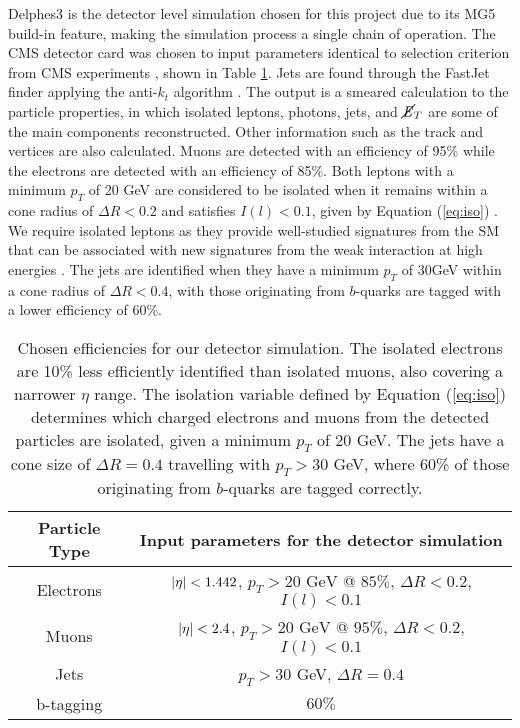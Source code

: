 Delphes3 \cite{de2014delphes} is the detector level simulation chosen for this project due to its MG5 build-in feature, making the simulation process a single chain of operation. The CMS detector card was chosen to input parameters identical to selection criterion from CMS experiments \cite{cms2019search, cms2016searches, cms2017search}, shown in Table \ref{tab:efficiencies}. Jets are found through the FastJet finder \cite{cacciari2012fastjet} applying the anti-$k_t$ algorithm \cite{cacciari2008anti}. The output is a smeared calculation to the particle properties, in which isolated leptons, photons, jets, and $\cancel{\it{E}}_{T}$ are some of the main components reconstructed. Other information such as the track and vertices are also calculated. Muons are detected with an efficiency of 95\% while the electrons are detected with an efficiency of 85\%. Both leptons with a minimum $p_T$ of 20 GeV are considered to be isolated when it remains within a cone radius of $\Delta R <0.2$ and satisfies $I(l)<0.1$, given by Equation (\ref{eq:iso}) \cite{de2014delphes}. We require isolated leptons as they provide well-studied signatures from the SM that can be associated with new signatures from the weak interaction at high energies \cite{diaconu2004isolated}. The jets are identified when they have a minimum $p_T$ of 30GeV within a cone radius of $\Delta R <0.4$, with those originating from $b$-quarks are tagged with a lower efficiency of 60\%. \\

\begin{table}[htbp]
    \centering
    \begin{tabular}{c|c}
    \toprule
    Particle Type & Input parameters for the detector simulation \\
    \midrule
    \rowcolor{gray!6} Electrons & $\abs{\eta} < 1.442$, $p_T > 20\text{ GeV}$ @ $85\%$, $\Delta R <0.2$, $I(l) <0.1$\\
    Muons & $\abs{\eta} < 2.4$, $p_T > 20\text{ GeV}$ @ $95\%$, $\Delta R < 0.2$, $I(l) <0.1$\\
    \rowcolor{gray!6} Jets & $p_T>30$ GeV, $\Delta R = 0.4$\\
    b-tagging & $60\%$ \\
    \bottomrule
    \end{tabular}
    \caption{Chosen efficiencies for our detector simulation. The isolated electrons are 10\% less efficiently identified than isolated muons, also covering a narrower $\eta$ range. The isolation variable defined by Equation (\ref{eq:iso}) determines which charged electrons and muons from the detected particles are isolated, given a minimum $p_T$ of 20 GeV. The jets have a cone size of $\Delta R = 0.4$ travelling with $p_T>30$ GeV, where 60\% of those originating from $b$-quarks are tagged correctly.} 
    \label{tab:efficiencies}    
\end{table}

